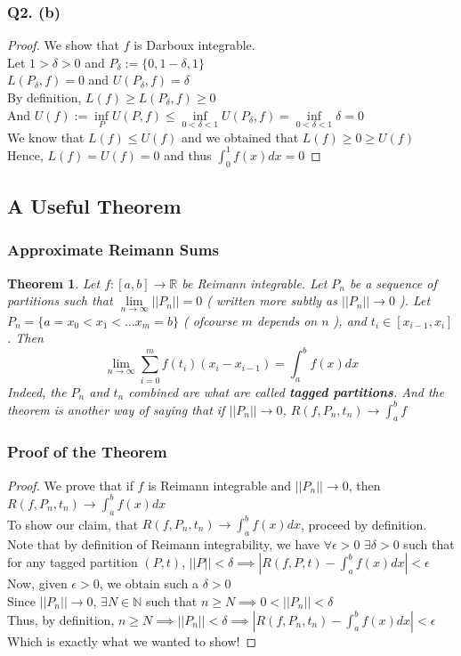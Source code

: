 \documentclass[aspectratio=169]{beamer}
\newtheorem{thm}{Theorem}
\newcommand{\bN}{\mathbb{N}}
\newcommand{\bR}{\mathbb{R}}
\begin{document}
\begin{frame}
\frametitle{Q2. (b)}
\begin{proof}
\pause
We show that $f$ is Darboux integrable. \\ \pause
Let $1>\delta>0$ and $P_\delta := \{0,1-\delta,1\}$ \\ \pause
$L(P_\delta,f) = 0$ and $U(P_\delta,f) = \delta$ \\ \pause
By definition, $L(f) \geqslant L(P_\delta,f) \geqslant 0$ \\ \pause
And $U(f) := \inf\limits_P U(P,f) \leqslant \inf\limits_{0<\delta<1} U(P_\delta,f) = \inf\limits_{0<\delta<1} \delta = 0$\\ \pause
We know that $L(f)\leqslant U(f)$ and we obtained that $L(f)\geqslant 0 \geqslant U(f)$ \\ \pause
Hence, $L(f)=U(f)=0$ and thus $\int_0^1 f(x)dx = 0$
\end{proof}
\end{frame}

\subsection{A Useful Theorem}
\begin{frame}
\frametitle{Approximate Reimann Sums}
\pause
\begin{thm}
Let $f:[a,b]\to \bR$ be Reimann integrable. Let $P_n$ be a sequence of partitions such that $\lim\limits_{n\to\infty}||P_n||=0$ ( written more subtly as $||P_n|| \to 0$ ). Let $P_n = \{a=x_0<x_1<\dots x_m=b\}$ ( ofcourse $m$ depends on $n$ ), and $t_i \in [x_{i-1},x_i]$. Then
$$\lim\limits_{n\to\infty} \sum\limits_{i=0}^m f(t_i)(x_i-x_{i-1}) = \int_a^b f(x)dx$$
Indeed, the $P_n$ and $t_n$ combined are what are called {\bf tagged partitions}. And the theorem is another way of saying that if $||P_n||\to 0$, $R(f,P_n,t_n) \to \int_a^b f$
\end{thm}
\end{frame}

\begin{frame}
\frametitle{Proof of the Theorem}
\begin{proof}
\pause
We prove that if $f$ is Reimann integrable and $||P_n||\to 0$, then $R(f,P_n,t_n)\to \int_a^b f(x)dx$\\ \pause
To show our claim, that $R(f,P_n,t_n) \to \int_a^b f(x)dx$, proceed by definition. \\ \pause
Note that by definition of Reimann integrability, we have $\forall \epsilon>0 \,\,\exists \delta>0$ such that for any tagged partition $(P,t)$, $||P||<\delta \implies |R(f,P,t)-\int_a^b f(x)dx|<\epsilon$\\ \pause
Now, given $\epsilon>0$, we obtain such a $\delta>0$\\ \pause
Since $||P_n|| \to 0$, $\exists N\in \bN$ such that $n\geqslant N \implies 0<||P_n||<\delta$\\ \pause
Thus, by definition, $n\geqslant N \implies ||P_n||<\delta \implies |R(f,P_n,t_n)-\int_a^b f(x)dx|<\epsilon$ \\ \pause
Which is exactly what we wanted to show!
\end{proof}
\end{frame}
\end{document}
